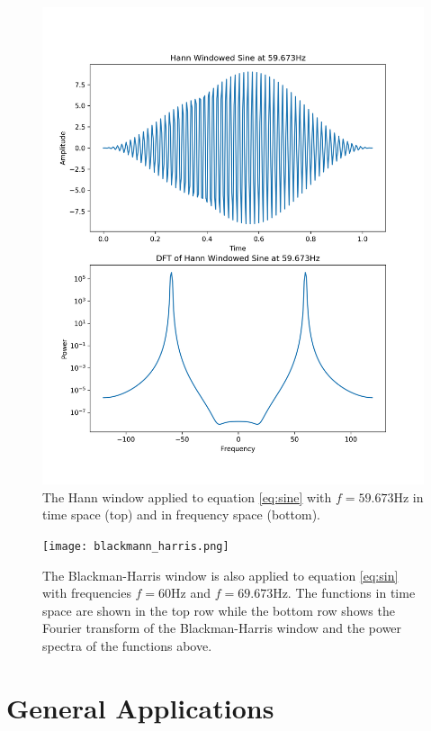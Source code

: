 \documentclass[11pt, letterpage]{article}
\begin{document}
\begin{figure}
  \includegraphics[width=\linewidth]{hann_1.png}
  \caption{
    The Hann window applied to equation \ref{eq:sine} with $f = 59.673$Hz in
    time space (top) and in frequency space (bottom).
  }
  \label{fig:hann_1}
\end{figure}

\begin{figure}
  \texttt{[image: blackmann\_harris.png]}
  \caption{
    The Blackman-Harris window is also applied to equation \ref{eq:sin} with
    frequencies $f = 60$Hz and $f = 69.673$Hz. The functions in time space are
    shown in the top row while the bottom row shows the Fourier transform of the
    Blackman-Harris window and the power spectra of the functions above.
  }
  \label{fig:blackman_harris}
\end{figure}

\section{General Applications}
\end{document}

